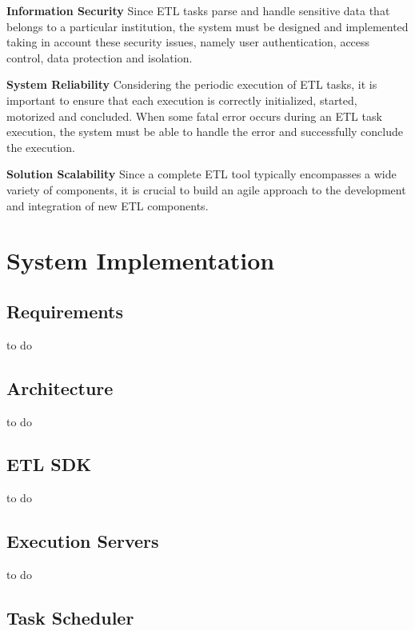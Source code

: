 \documentclass[
  11pt,
]{krantz}
\begin{document}
\textbf{Information Security}
Since ETL tasks parse and handle sensitive data that belongs to a particular institution, the system must be designed and implemented taking in account these security issues, namely user authentication, access control, data protection and isolation.

\textbf{System Reliability}
Considering the periodic execution of ETL tasks, it is important to ensure that each execution is correctly initialized, started, motorized and concluded. When some fatal error occurs during an ETL task execution, the system must be able to handle the error and successfully conclude the execution.

\textbf{Solution Scalability}
Since a complete ETL tool typically encompasses a wide variety of components, it is crucial to build an agile approach to the development and integration of new ETL components.

\hypertarget{system-implementation}{%
\chapter{System Implementation}\label{system-implementation}}

\hypertarget{requirements}{%
\section{Requirements}\label{requirements}}

to do

\hypertarget{architecture}{%
\section{Architecture}\label{architecture}}

to do

\hypertarget{etl-sdk}{%
\section{ETL SDK}\label{etl-sdk}}

to do

\hypertarget{execution-servers}{%
\section{Execution Servers}\label{execution-servers}}

to do

\hypertarget{task-scheduler}{%
\section{Task Scheduler}\label{task-scheduler}}
\end{document}

